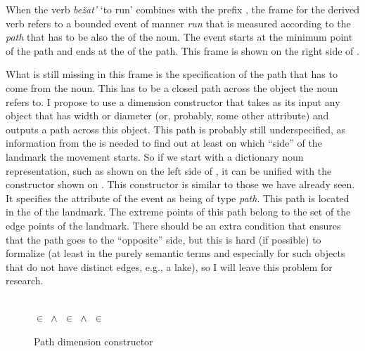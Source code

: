 When the verb \textit{be\v{z}at'} `to run' combines with the prefix , the frame for the derived verb refers to a bounded  event of manner \textit{run} that is measured according to the \textit{path} that has to be also the  of the noun. The event starts at the minimum point of the path and ends at the  of the path. This frame is shown on the right side of .

What is still missing in this frame is the specification of the path that has to come from the noun. This has to be a closed path across the object the noun refers to. I propose to use a dimension constructor that takes as its input any object that has width or diameter (or, probably, some other attribute) and outputs a path across this object. This path is probably still underspecified, as information from the  is needed to find out at least on which ``side'' of the landmark the movement starts. So if we start with a dictionary noun representation, such as shown on the left side of , it can be unified with the constructor shown on . This constructor is similar to those we have already seen. It specifies the \NOUNDIM attribute of the event as being of type \textit{path}. This path is located in the \LOC of the landmark. The extreme points of this path belong to the set of the edge points of the landmark. There should be an extra condition that ensures that the path goes to the ``opposite'' side, but this is hard (if possible) to formalize (at least in the purely semantic terms and especially for such objects that do not have distinct edges, e.g., a lake), so I will leave this problem for  research.  

\begin{figure}\small
\begin{minipage}{0.33\textwidth}\centering
{}\end{minipage}\hfill%
\begin{minipage}{0.33\textwidth}\centering
{}\\
 $\in$  $\,\wedge\,$  $\in$  $\,\wedge\,$  $\in$ 
\end{minipage}\hfill%
\begin{minipage}{0.33\textwidth}\centering
\end{minipage}
\caption{Path dimension constructor\label{constructor:path}}
\end{figure}

